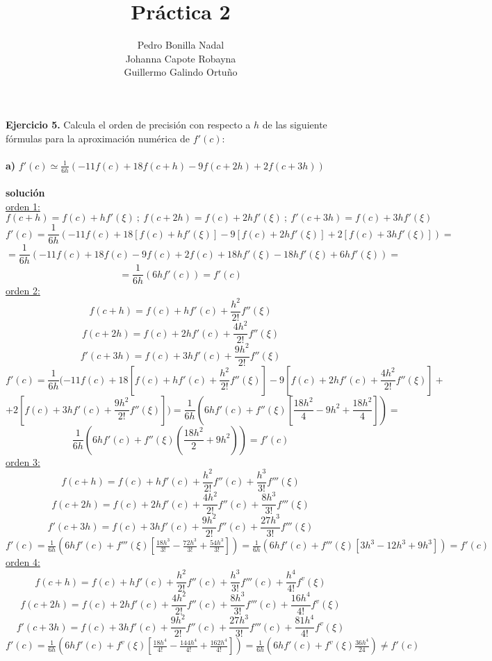 \documentclass[11pt]{article}
\title{\textbf{Práctica 2}}
\author{Pedro Bonilla Nadal\\
		Johanna Capote Robayna\\
		Guillermo Galindo Ortuño}
\date{}
\begin{document}
\maketitle

\textbf{Ejercicio 5.} Calcula el orden de precisión con respecto a $h$ de las siguiente fórmulas para la aproximación numérica de $f'(c)$: \\ \\

\textbf{a)} $f'(c) \simeq \frac{1}{6h}(-11f(c) + 18f(c + h) -9f(c + 2h) +2f(c+3h))$ \\ \\
\textbf{solución} \\
\underline{orden 1:} \\
$$f(c + h) = f(c) + hf'(\xi) \ ; \ f(c + 2h) = f(c) + 2hf'(\xi) \ ; \ f'(c + 3h) = f(c) + 3hf'(\xi)$$
$$f'(c) = \frac{1}{6h}(-11f(c) + 18  [f(c) + hf'(\xi)] - 9  [f(c) + 2hf'(\xi)] + 2 [f(c) + 3hf'(\xi)]) = $$
$$= \frac{1}{6h}(-11f(c) + 18f(c) - 9f(c) + 2f(c) + 18hf'(\xi) - 18hf'(\xi) + 6hf'(\xi)) = $$
$$= \frac{1}{6h}(6hf'(c)) = f'(c) $$
\underline{orden 2:} \\
$$ f(c + h) = f(c) + hf'(c) + \frac{h^{2}}{2!} f''(\xi)$$ $$ f(c + 2h) = f(c) + 2hf'(c) + \frac{4h^{2}}{2!} f''(\xi)$$ $$f'(c + 3h) = f(c) + 3hf'(c) + \frac{9h^{2}}{2!} f''(\xi) $$
$$f'(c) = \frac{1}{6h}(-11f(c) + 18  [f(c) + hf'(c) + \frac{h^{2}}{2!} f''(\xi)] - 9  [f(c) + 2hf'(c) + \frac{4h^{2}}{2!} f''(\xi)] +$$ $$ + 2 [f(c) + 3hf'(c) + \frac{9h^{2}}{2!} f''(\xi)]) = \frac{1}{6h}(6hf'(c) + f''(\xi)[\frac{18h^{2}}{4} - 9h^{2} + \frac{18h^{2}}{4}]) = $$ $$\frac{1}{6h}(6hf'(c) + f''(\xi)(\frac{18h^{2}}{2} + 9h^{2})) = f'(c)$$
\underline{orden 3:} \\
$$ f(c + h) = f(c) + hf'(c) + \frac{h^{2}}{2!} f''(c) + \frac{h^{3}}{3!}f'''(\xi)$$
$$ f(c + 2h) = f(c) + 2hf'(c) + \frac{4h^{2}}{2!} f''(c) + \frac{8h^{3}}{3!}f'''(\xi)$$
$$f'(c + 3h) = f(c) + 3hf'(c) + \frac{9h^{2}}{2!} f''(c) + \frac{27h^{3}}{3!}f'''(\xi)$$
$f'(c) = \frac{1}{6h}(6hf'(c) + f'''(\xi)[\frac{18h^{3}}{3!} - \frac{72h^{3}}{3!} + \frac{54h^{3}}{3!}]) =  \frac{1}{6h}(6hf'(c) + f'''(\xi)[3h^{3} - 12h^{3} + 9h^{3}]) = f'(c)  $ \\
\underline{orden 4:} \\
$$ f(c + h) = f(c) + hf'(c) + \frac{h^{2}}{2!} f''(c) + \frac{h^{3}}{3!}f'''(c) + \frac{h^{4}}{4!}f^{v}(\xi)$$
$$ f(c + 2h) = f(c) + 2hf'(c) + \frac{4h^{2}}{2!} f''(c) + \frac{8h^{3}}{3!}f'''(c) + \frac{16h^{4}}{4!}f^{v}(\xi)$$
$$f'(c + 3h) = f(c) + 3hf'(c) + \frac{9h^{2}}{2!} f''(c) + \frac{27h^{3}}{3!}f'''(c) + \frac{81h^{4}}{4!}f^{v}(\xi)$$
$f'(c) = \frac{1}{6h}(6hf'(c) + f^{v}(\xi)[\frac{18h^{4}}{4!} - \frac{144h^{4}}{4!} + \frac{162h^{4}}{4!}]) = \frac{1}{6h}(6hf'(c) + f^{v}(\xi)\frac{36h^{4}}{24}) \neq f'(c) $ \\
\end{document}
